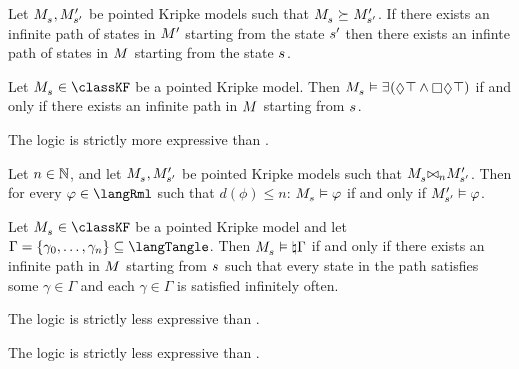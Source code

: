 \begin{lemma}
Let $\kPModel{\kStateS}, \kPModelP{\kStateSP}$ be pointed Kripke models such that $\kPModel{\kStateS} \simulates \kPModelP{\kStateSP}$.
If there exists an infinite path of states in ${M^{\prime}_{}}$ starting from the state ${s}^{\prime}$ then there exists an infinte path of states in $\kModel$ starting from the state $\kStateS$.
\end{lemma}


\begin{lemma}
Let $\kPModel{\kStateS} \in \classKF$ be a pointed Kripke model.
Then $\kPModel{\kStateS} \entails \somerefs(\possible \top \land \necessary \possible \top)$ if and only if there exists an infinite path in $\kModel$ starting from $\kStateS$.
\end{lemma}


\begin{theorem}
The logic \logicRmlKF{} is strictly more expressive than \logicKF{}.
\end{theorem}


\begin{lemma}
    Let $n \in \mathbb{N}$, and let $\kPModel{\kStateS}, \kPModelP{\kStateSP}$ be pointed Kripke models such that $\kPModel{\kStateS} \mutualrefines[n] \kPModelP{\kStateSP}$.
    Then for every $\phi \in \langRml$ such that $d(\phi) \leq n$: $\kPModel{\kStateS} \entails \phi$ if and only if ${M^{\prime}_{{s}^{\prime}}} \vDash \varphi$.
\end{lemma}


\begin{lemma}
Let $\kPModel{\kStateS} \in \classKF$ be a pointed Kripke model and let $\Gamma = \{\gamma_0, \dots, \gamma_n\} \subseteq \langTangle$.
Then $\kPModel{\kStateS} \entails \tangle \Gamma$ if and only if there exists an infinite path in $\kModel$ starting from $\kStateS$ such that every state in the path satisfies some $\gamma \in \Gamma$ and each $\gamma \in \Gamma$ is satisfied infinitely often.
\end{lemma}


\begin{theorem}
The logic \logicRmlKF{} is strictly less expressive than \logicTangleKF{}.
\end{theorem}


\begin{corollary}
The logic \logicRmlKF{} is strictly less expressive than \logicMuKF{}.
\end{corollary}

